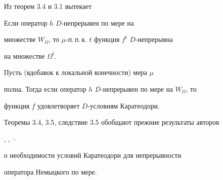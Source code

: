 Из теорем 3.4 и 3.1 вытекает





\begin{thms} Если оператор $h$ \; $D$-непрерывен по мере на


множестве $W_\Omega$, то $\mu$-п.\,п.\,к. $t$ функция $f^t$ \; $D$-непрерывна


на множестве $\Omega^t$.


\end{thms}





\begin{cors} Пусть (вдобавок к локальной конечности) мера $\mu$


полна. Тогда если оператор $h$ \; $D$-непрерывен по мере на $W_\Omega$, то


функция $f$ удовлетворяет $D$-условиям Каратеодори.


\end{cors}





Теоремы 3.4, 3.5, следствие 3.5 обобщают  прежние  результаты  авторов


\cite{Nep1}, \cite{Nep2}, \cite{Sh6}--\cite{Nep3}


о необходимости условий Каратеодори для непрерывности


оператора Немыцкого по мере. \medskip





